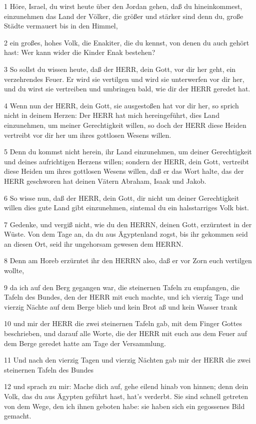 \par 1 Höre, Israel, du wirst heute über den Jordan gehen, daß du hineinkommest, einzunehmen das Land der Völker, die größer und stärker sind denn du, große Städte vermauert bis in den Himmel,
\par 2 ein großes, hohes Volk, die Enakiter, die du kennst, von denen du auch gehört hast: Wer kann wider die Kinder Enak bestehen?
\par 3 So sollst du wissen heute, daß der HERR, dein Gott, vor dir her geht, ein verzehrendes Feuer. Er wird sie vertilgen und wird sie unterwerfen vor dir her, und du wirst sie vertreiben und umbringen bald, wie dir der HERR geredet hat.
\par 4 Wenn nun der HERR, dein Gott, sie ausgestoßen hat vor dir her, so sprich nicht in deinem Herzen: Der HERR hat mich hereingeführt, dies Land einzunehmen, um meiner Gerechtigkeit willen, so doch der HERR diese Heiden vertreibt vor dir her um ihres gottlosen Wesens willen.
\par 5 Denn du kommst nicht herein, ihr Land einzunehmen, um deiner Gerechtigkeit und deines aufrichtigen Herzens willen; sondern der HERR, dein Gott, vertreibt diese Heiden um ihres gottlosen Wesens willen, daß er das Wort halte, das der HERR geschworen hat deinen Vätern Abraham, Isaak und Jakob.
\par 6 So wisse nun, daß der HERR, dein Gott, dir nicht um deiner Gerechtigkeit willen dies gute Land gibt einzunehmen, sintemal du ein halsstarriges Volk bist.
\par 7 Gedenke, und vergiß nicht, wie du den HERRN, deinen Gott, erzürntest in der Wüste. Von dem Tage an, da du aus Ägyptenland zogst, bis ihr gekommen seid an diesen Ort, seid ihr ungehorsam gewesen dem HERRN.
\par 8 Denn am Horeb erzürntet ihr den HERRN also, daß er vor Zorn euch vertilgen wollte,
\par 9 da ich auf den Berg gegangen war, die steinernen Tafeln zu empfangen, die Tafeln des Bundes, den der HERR mit euch machte, und ich vierzig Tage und vierzig Nächte auf dem Berge blieb und kein Brot aß und kein Wasser trank
\par 10 und mir der HERR die zwei steinernen Tafeln gab, mit dem Finger Gottes beschrieben, und darauf alle Worte, die der HERR mit euch aus dem Feuer auf dem Berge geredet hatte am Tage der Versammlung.
\par 11 Und nach den vierzig Tagen und vierzig Nächten gab mir der HERR die zwei steinernen Tafeln des Bundes
\par 12 und sprach zu mir: Mache dich auf, gehe eilend hinab von hinnen; denn dein Volk, das du aus Ägypten geführt hast, hat's verderbt. Sie sind schnell getreten von dem Wege, den ich ihnen geboten habe: sie haben sich ein gegossenes Bild gemacht.
